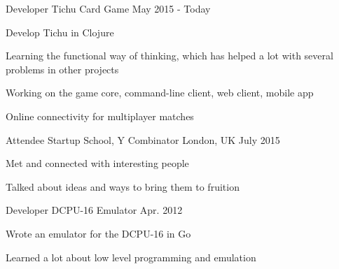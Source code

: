 
\begin{cventries}

  \cventry
    {Developer} %
    {Tichu Card Game} %
    {} %
    {May 2015 - Today} %
    {
      \begin{cvitems} %
        \item {Develop Tichu in Clojure}
        \item {Learning the functional way of thinking, which has helped a lot with several problems in other projects}
		\item {Working on the game core, command-line client, web client, mobile app}
		\item {Online connectivity for multiplayer matches}
      \end{cvitems}
    }

  \cventry
    {Attendee} %
    {Startup School, Y Combinator} %
    {London, UK} %
    {July 2015} %
    {
      \begin{cvitems} %
        \item {Met and connected with interesting people}
        \item {Talked about ideas and ways to bring them to fruition}
      \end{cvitems}
    }
	
  \cventry
    {Developer} %
    {DCPU-16 Emulator} %
    {} %
    {Apr. 2012} %
    {
      \begin{cvitems} %
        \item {Wrote an emulator for the DCPU-16 in Go}
		\item {Learned a lot about low level programming and emulation}
      \end{cvitems}
    }


\end{cventries}
